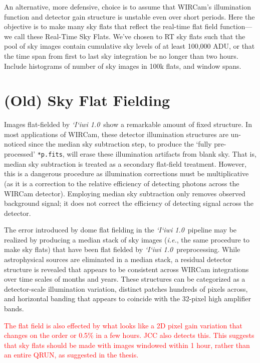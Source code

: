 \documentclass[iop]{emulateapj}
\newcommand{\ie}{\textit{i.e.}}
\newcommand{\sw}[1]{\textit{#1}} %
\newcommand{\iiwione}{\sw{`I`iwi 1.0}}
\newcommand{\changeit}[1]{\textcolor{red}{#1}} %
\newcommand{\todo}[1]{\textcolor{RedOrange}{#1}} %
\begin{document}
An alternative, more defensive, choice is to assume that WIRCam's illumination function and detector gain structure is unstable even over short periods.
Here the objective is to make many sky flats that reflect the real-time flat field function---we call these Real-Time Sky Flats.
We've chosen to RT sky flats such that the pool of sky images contain cumulative sky levels of at least 100,000 ADU, or that the time span from first to last sky integration be no longer than two hours.
\todo{Include histograms of number of sky images in 100k flats, and window spans.}

\section{(Old) Sky Flat Fielding}

Images flat-fielded by \iiwione\ show a remarkable amount of fixed structure.
In most applications of WIRCam, these detector illumination structures are un-noticed since the median sky subtraction step, to produce the `fully pre-processed' \texttt{*p.fits}, will erase these illumination artifacts from blank sky.
That is, median sky subtraction is treated as a secondary flat-field treatment.
However, this is a dangerous procedure as illumination corrections must be multiplicative (as it is a correction to the relative efficiency of detecting photons across the WIRCam detector).
Employing median sky subtraction only removes observed background signal; it does not correct the efficiency of detecting signal across the detector.

The error introduced by dome flat fielding in the \iiwione\ pipeline may be realized by producing a median stack of sky images (\ie, the same procedure to make sky flats) that have been flat fielded by \iiwione\ preprocessing.
While astrophysical sources are eliminated in a median stack, a residual detector structure is revealed that appears to be consistent across WIRCam integrations over time scales of months and years.
These structures can be categorized as a detector-scale illumination variation, distinct patches hundreds of pixels across, and horizontal banding that appears to coincide with the 32-pixel high amplifier bands.

\changeit{The flat field is also effected by what looks like a 2D pixel gain variation that changes on the order or 0.5\% in a few hours. JCC also detects this. This suggests that sky flats should be made with images windowed within 1 hour, rather than an entire QRUN, as suggested in the thesis.}
\end{document}
